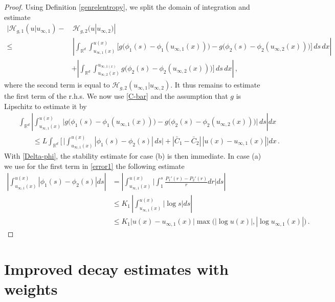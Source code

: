 \documentclass[reqno]{amsart}
\newcommand{\R}{\mathbb{R}}
\renewcommand{\H}{{\mathcal{H}}}
\begin{document}
\begin{proof}
Using Definition \ref{genrelentropy}, we split the domain of integration and estimate 
\begin{align*}
    |\H_{g,1}(u|u_{\infty,1}) - &\, \H_{g,2}(u|u_{\infty,2})| \\ \le &\, \left|\int_{\R^d}\int_{u_{\infty,1}(x)}^{u(x)} \big[g\big(\phi_1(s)-\phi_1(u_{\infty,1}(x))\big) - g\big(\phi_2(s)-\phi_2(u_{\infty,2}(x))\big) \big]\,ds\,dx \right| \\
    & +\left|\int_{\R^d}\int_{u_{\infty,2}(x)}^{u_{\infty,1(x)}} g\big(\phi_2(s)-\phi_2(u_{\infty,2}(x))\big) \big]\,ds\,dx \right|\,,
\end{align*}
where the second term is equal to $\H_{g,2}(u_{\infty,1}|u_{\infty,2})$. It thus remains to estimate the first term of the r.h.s. We now use \eqref{C-bar} and the assumption that $g$ is Lipschitz to estimate it by
\begin{eqnarray}\label{error1}
    && \int_{\R^d}\left|\int_{u_{\infty,1}(x)}^{u(x)} \big|g\big(\phi_1(s)-\phi_1(u_{\infty,1}(x))\big) - g\big(\phi_2(s)-\phi_2(u_{\infty,2}(x))\big) \big|\,ds\right| dx \nonumber\\
    && \qquad \le L \int_{\R^d}\Big[ \,\Big|\int_{u_{\infty,1}(x)}^{u(x)} |\phi_1(s)-\phi_2(s)|\,ds\Big| + |\bar C_1-\bar C_2|\,|u(x)-u_{\infty,1}(x)| \Big]dx \,.
\end{eqnarray}
With \eqref{Delta-phi}, the stability estimate for case (b) is then immediate. In case (a) we  use for the first term in \eqref{error1} the following estimate
\begin{align*}
    \left|\int_{u_{\infty,1}(x)}^{u(x)} |\phi_1(s)-\phi_2(s)| ds\right|
    &= \left|\int_{u_{\infty,1}(x)}^{u(x)} \Big|\int_1^s \frac{P_1'(r)-P_2'(r)}{r} dr\Big| ds\right| \\
    &\le K_1\,\left|\int_{u_{\infty,1}(x)}^{u(x)} |\log s| ds\right| \\
    &\le K_1\big|u(x)-u_{\infty,1}(x)\big|\max\big(|\log u(x)|,|\log u_{\infty,1}(x)|\big)\,.
\end{align*}
\end{proof}






\section{Improved decay estimates with weights}\label{sec-funcineq}
\setcounter{equation}{0}
\end{document}
